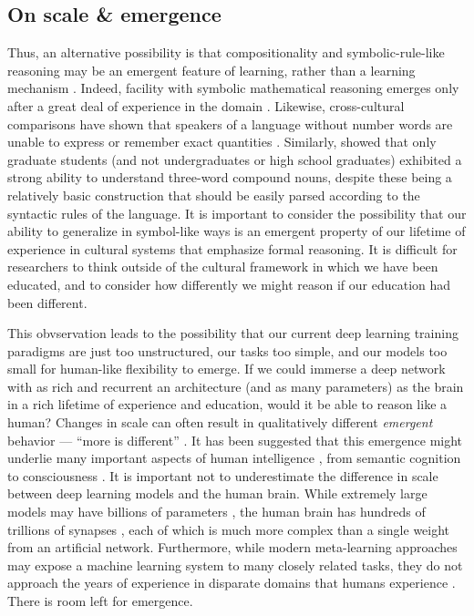 \subsection{On scale \& emergence}

Thus, an alternative possibility is that compositionality and symbolic-rule-like reasoning may be an emergent feature of learning, rather than a learning mechanism \citep{McClelland1999, McClelland2002, McClelland2010, McClelland2010a}. Indeed, facility with symbolic mathematical reasoning emerges only after a great deal of experience in the domain \citep{Burger1986, McClelland2016}. Likewise, cross-cultural comparisons have shown that speakers of a language without number words are unable to express or remember exact quantities \citep{Frank2008}. Similarly, \citet{Gleitman1970} showed that only graduate students (and not undergraduates or high school graduates) exhibited a strong ability to understand three-word compound nouns, despite these being a relatively basic construction that should be easily parsed according to the syntactic rules of the language. It is important to consider the possibility that our ability to generalize in symbol-like ways is an emergent property of our lifetime of experience in cultural systems that emphasize formal reasoning. It is difficult for researchers to think outside of the cultural framework in which we have been educated, and to consider how differently we might reason if our education had been different. \par 
This obvservation leads to the possibility that our current deep learning training paradigms are just too unstructured, our tasks too simple, and our models too small for human-like flexibility to emerge. If we could immerse a deep network with as rich and recurrent an architecture (and as many parameters) as the brain in a rich lifetime of experience and education, would it be able to reason like a human? Changes in scale can often result in qualitatively different \emph{emergent} behavior --- ``more is different'' \citep{Anderson1972}. It has been suggested that this emergence might underlie many important aspects of human intelligence \citep{McClelland2010a}, from semantic cognition \citep{Rogers2008, Saxe2019} to consciousness \citep{Chalmers2006}. It is important not to underestimate the difference in scale between deep learning models and the human brain. While extremely large models may have billions of parameters \citep[e.g.][]{Radford2019}, the human brain has hundreds of trillions of synapses \citep{Drachman2005}, each of which is much more complex than a single weight from an artificial network. Furthermore, while modern meta-learning approaches may expose a machine learning system to many closely related tasks, they do not approach the years of experience in disparate domains that humans experience \citep[c.f.][]{Mitchell2018}. There is room left for emergence.\par 
